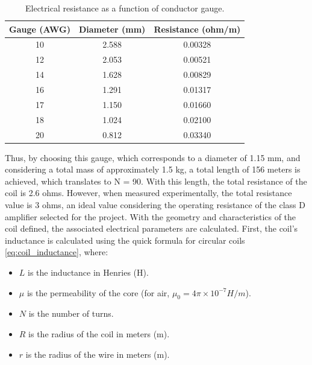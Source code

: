 \begin{table}[H]
    \centering
    \begin{tabular}{|c|c|c|}
    \hline
    \textbf{Gauge (AWG)} & \textbf{Diameter (mm)} & \textbf{Resistance (ohm/m)} \\ \hline
    10                     & 2.588                  & 0.00328                      \\ \hline
    12                     & 2.053                  & 0.00521                      \\ \hline
    14                     & 1.628                  & 0.00829                      \\ \hline
    16                     & 1.291                  & 0.01317                      \\ \hline
    17                     & 1.150                  & 0.01660                      \\ \hline
    18                     & 1.024                  & 0.02100                      \\ \hline
    20                     & 0.812                  & 0.03340                      \\ \hline
    \end{tabular}
    \caption{Electrical resistance as a function of conductor gauge.}
    \label{tab:resistance-table}
\end{table}

Thus, by choosing this gauge, which corresponds to a diameter of 1.15 mm, and considering a total mass of approximately 1.5 kg, a total length of 156 meters is achieved, which translates to N = 90. With this length, the total resistance of the coil is 2.6 ohms. However, when measured experimentally, the total resistance value is 3 ohms, an ideal value considering the operating resistance of the class D amplifier selected for the project.
\newp
With the geometry and characteristics of the coil defined, the associated electrical parameters are calculated. First, the coil's inductance is calculated using the quick formula for circular coils \ref{eq:coil_inductance},
where:

\begin{itemize}
    \item $L$ is the inductance in Henries (H).
    \item $\mu$ is the permeability of the core (for air, $\mu_0 = 4\pi \times 10^{-7} H/m$).
    \item $N$ is the number of turns.
    \item $R$ is the radius of the coil in meters (m).
    \item $r$ is the radius of the wire in meters (m).
\end{itemize}

